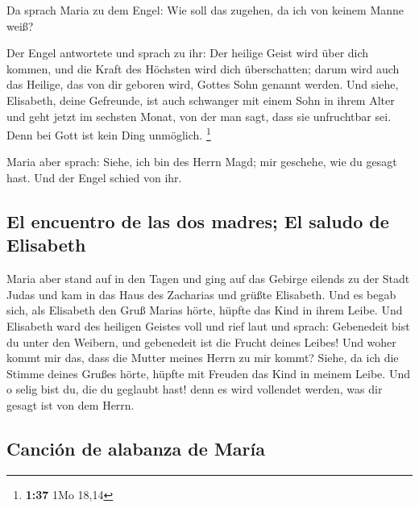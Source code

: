  Da sprach Maria zu dem Engel: Wie soll das zugehen, da
ich von keinem Manne weiß?

 Der Engel antwortete und sprach zu ihr: Der heilige
Geist wird über dich kommen, und die Kraft des Höchsten wird dich
überschatten; darum wird auch das Heilige, das von dir geboren wird,
Gottes Sohn genannt werden.  Und siehe, Elisabeth, deine
Gefreunde, ist auch schwanger mit einem Sohn in ihrem Alter und geht
jetzt im sechsten Monat, von der man sagt, dass sie unfruchtbar sei.
 Denn bei Gott ist kein Ding unmöglich. \footnote{\textbf{1:37}
  1Mo 18,14}

 Maria aber sprach: Siehe, ich bin des Herrn Magd; mir
geschehe, wie du gesagt hast. Und der Engel schied von ihr.

\hypertarget{el-encuentro-de-las-dos-madres-el-saludo-de-elisabeth}{%
\subsection{El encuentro de las dos madres; El saludo de
Elisabeth}\label{el-encuentro-de-las-dos-madres-el-saludo-de-elisabeth}}

 Maria aber stand auf in den Tagen und ging auf das
Gebirge eilends zu der Stadt Judas  und kam in das Haus
des Zacharias und grüßte Elisabeth.  Und es begab sich,
als Elisabeth den Gruß Marias hörte, hüpfte das Kind in ihrem Leibe. Und
Elisabeth ward des heiligen Geistes voll  und rief laut
und sprach: Gebenedeit bist du unter den Weibern, und gebenedeit ist die
Frucht deines Leibes!  Und woher kommt mir das, dass die
Mutter meines Herrn zu mir kommt?  Siehe, da ich die
Stimme deines Grußes hörte, hüpfte mit Freuden das Kind in meinem Leibe.
 Und o selig bist du, die du geglaubt hast! denn es wird
vollendet werden, was dir gesagt ist von dem Herrn.

\hypertarget{canciuxf3n-de-alabanza-de-maruxeda}{%
\subsection{Canción de alabanza de
María}\label{canciuxf3n-de-alabanza-de-maruxeda}}

